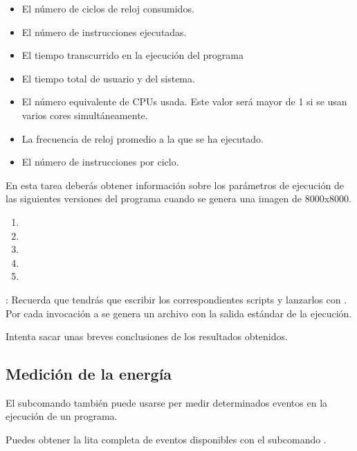 \begin{itemize}
  \item El número de ciclos de reloj consumidos.
  \item El número de instrucciones ejecutadas.
  \item El tiempo transcurrido en la ejecución del programa
  \item El tiempo total de usuario y del sistema.
  \item El número equivalente de CPUs usada. Este valor será mayor de 1 si
        se usan varios cores simultáneamente.
  \item La frecuencia de reloj promedio a la que se ha ejecutado.
  \item El número de instrucciones por ciclo.
\end{itemize}

En esta tarea deberás obtener información sobre los parámetros de ejecución de
las siguientes versiones del programa cuando se genera una imagen de 8000x8000.

\begin{enumerate}
  \item {}
  \item {}
  \item {}
  \item {}
  \item {}
\end{enumerate}

: Recuerda que tendrás que escribir los correspondientes
scripts y lanzarlos con . Por cada invocación a
 se genera un archivo  con la salida
estándar de la ejecución.

Intenta sacar unas breves conclusiones de los resultados obtenidos.

\subsection{Medición de la energía}

El subcomando  también puede usarse per medir determinados eventos
en la ejecución de un programa.

Puedes obtener la lita completa de eventos disponibles con el subcomando .

